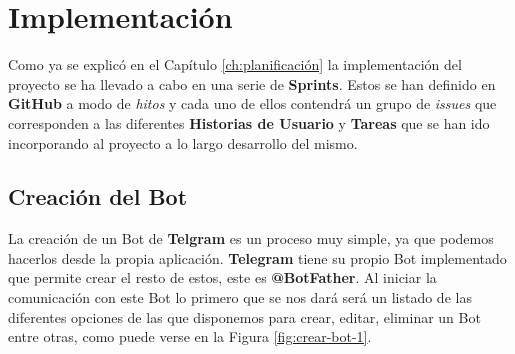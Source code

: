 \chapter{Implementación}

Como ya se explicó en el Capítulo \ref{ch:planificación} la implementación del proyecto se ha llevado a cabo en una serie de \textbf{Sprints}. Estos se han definido en \textbf{GitHub} a modo de \textit{hitos} y cada uno de ellos contendrá un grupo de \textit{issues} que corresponden a las diferentes \textbf{Historias de Usuario} y \textbf{Tareas} que se han ido incorporando al proyecto a lo largo desarrollo del mismo. \\

\section{Creación del Bot}

La creación de un Bot de \textbf{Telgram} es un proceso muy simple, ya que podemos hacerlos desde la propia aplicación. \textbf{Telegram} tiene su propio Bot implementado que permite crear el resto de estos, este es \textbf{@BotFather}. Al iniciar la comunicación con este Bot lo primero que se nos dará será un listado de las diferentes opciones de las que disponemos para crear, editar, eliminar un Bot entre otras, como puede verse en la Figura \ref{fig:crear-bot-1}.

